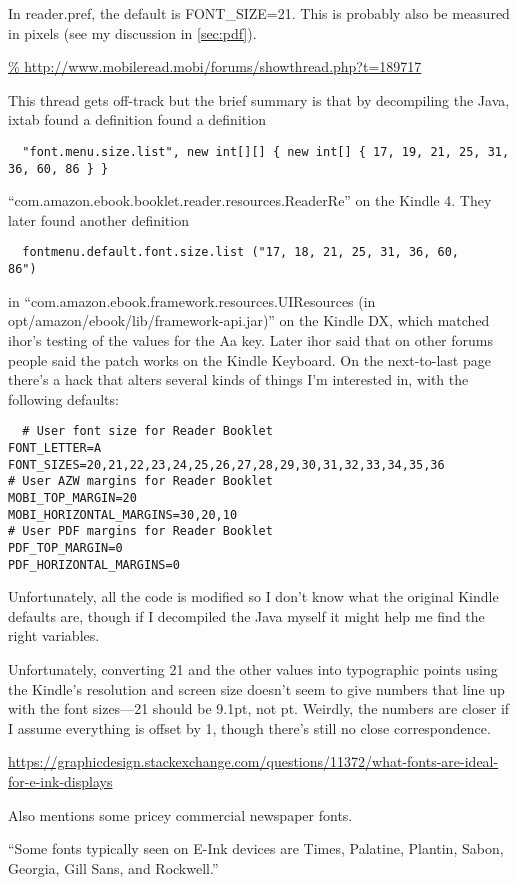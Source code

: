 \documentclass[12pt]{article}
\begin{document}
In reader.pref, the default is FONT_SIZE=21.  This is probably also be
measured in pixels (see my discussion in \ref{sec:pdf}).

\url{%
http://www.mobileread.mobi/forums/showthread.php?t=189717
}

This thread gets off-track but the brief summary is that by
decompiling the Java, ixtab found a definition
found a definition
\begin{lstlisting}
  "font.menu.size.list", new int[][] { new int[] { 17, 19, 21, 25, 31, 36, 60, 86 } }
\end{lstlisting}
``com.amazon.ebook.booklet.reader.resources.ReaderRe'' on the Kindle
4.  They later found another definition
\begin{lstlisting}
  fontmenu.default.font.size.list ("17, 18, 21, 25, 31, 36, 60,
86")
\end{lstlisting}
in ``com.amazon.ebook.framework.resources.UIResources (in
opt/amazon/ebook/lib/framework-api.jar)'' on the Kindle DX, which
matched ihor's testing of the values for the Aa key.  Later ihor said
that on other forums people said the patch works on the Kindle
Keyboard.  On the next-to-last page there's a hack that alters several
kinds of things I'm interested in, with the following defaults:
\begin{lstlisting}
  # User font size for Reader Booklet
FONT_LETTER=A
FONT_SIZES=20,21,22,23,24,25,26,27,28,29,30,31,32,33,34,35,36
# User AZW margins for Reader Booklet
MOBI_TOP_MARGIN=20
MOBI_HORIZONTAL_MARGINS=30,20,10
# User PDF margins for Reader Booklet
PDF_TOP_MARGIN=0
PDF_HORIZONTAL_MARGINS=0
\end{lstlisting}
Unfortunately, all the code is modified so I don't know what the
original Kindle defaults are, though if I decompiled the Java myself
it might help me find the right variables.

Unfortunately, converting 21 and the other values into typographic
points using the Kindle's resolution and screen size doesn't seem to
give numbers that line up with the font sizes---21 should be 9.1pt,
not  pt.  Weirdly, the numbers are closer if I assume
everything is offset by 1, though there's still no close
correspondence.


\url{https://graphicdesign.stackexchange.com/questions/11372/what-fonts-are-ideal-for-e-ink-displays}

Also mentions some pricey commercial newspaper fonts.

``Some fonts typically seen on E-Ink devices are Times, Palatine, Plantin, Sabon, Georgia, Gill Sans, and Rockwell.''
\end{document}
